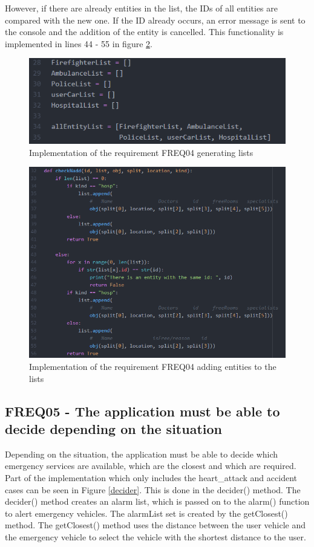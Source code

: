However, if there are already entities in the list, the IDs of all entities are compared with the new one. If the ID already occurs, an error message is sent to the console and the addition of the entity is cancelled. This functionality is implemented in lines 44 - 55 in figure \ref{FREQ042}.


\begin{figure}
\sidecaption
\includegraphics[scale=0.4]{images/walter/code/FREQ04-00.png}
\caption{Implementation of the requirement FREQ04 generating lists}
\label{FREQ041}
\end{figure}

\begin{figure}
\sidecaption
\includegraphics[scale=0.4]{images/walter/code/FREQ04-02.png}
\caption{Implementation of the requirement FREQ04 adding entities to the lists}
\label{FREQ042}
\end{figure}


\subsection{FREQ05 - The application must be able to decide depending on the situation}
Depending on the situation, the application must be able to decide which emergency services are available, which are the closest and which are required. Part of the implementation which only includes the heart\_attack and accident cases can be seen in Figure \ref{decider}. This is done in the decider() method. The decider() method creates an alarm list, which is passed on to the alarm() function to alert emergency vehicles. The alarmList set is created by the getClosest() method. The getClosest() method uses the distance between the user vehicle and the emergency vehicle to select the vehicle with the shortest distance to the user.

